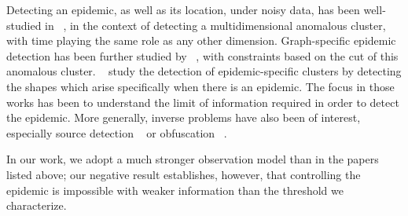 

Detecting an epidemic, as well as its location, under noisy data, has been well-studied in ~\cite{Arias-castro2011}, in the context of detecting a multidimensional anomalous cluster, with time playing the same role as any other dimension. Graph-specific epidemic detection has been further studied by ~\cite{Sharpnack2012}, with constraints based on the cut of this anomalous cluster. ~\cite{Milling2015} study the detection of epidemic-specific clusters by detecting the shapes which arise specifically when there is an epidemic. The focus in those works has been to understand the limit of information required in order to detect the epidemic. More generally, inverse problems have also been of interest, especially source detection ~\cite{spencer2015impossibility,shah2011rumors, shah2012rumor,wang2014rumor, shah2010detecting} or obfuscation ~\cite{fanti2015spy, fanti2016rumor}. 

In our work, we adopt a much stronger observation model than in the papers listed above; our negative result establishes, however, that controlling the epidemic is impossible with weaker information than the threshold we characterize.


